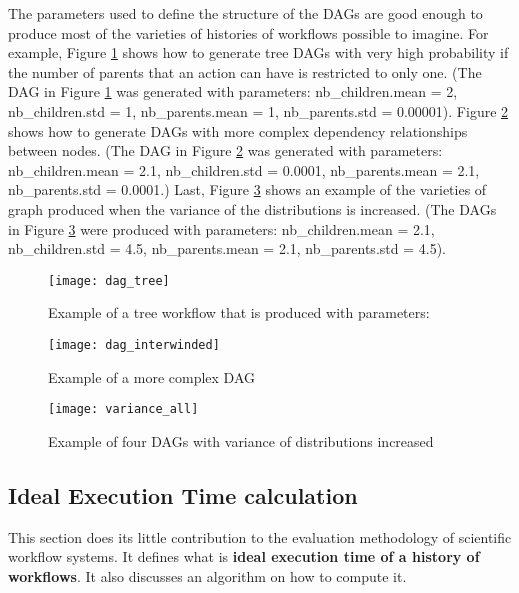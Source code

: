 The parameters used to define the structure of the DAGs are good enough to produce most of the varieties of histories of workflows possible to imagine.  For example, Figure \ref{fig:dag_tree} shows how to generate tree DAGs with very high probability if the number of parents that an action can have is restricted to only one.  (The DAG in Figure \ref{fig:dag_tree} was generated with parameters:
nb\_children.mean = 2, nb\_children.std =  1, nb\_parents.mean = 1, nb\_parents.std = 0.00001). Figure \ref{fig:dag_complex} shows how to generate DAGs with more complex dependency relationships between nodes.  (The DAG in Figure \ref{fig:dag_complex} was generated with parameters:  nb\_children.mean = 2.1, nb\_children.std = 0.0001, nb\_parents.mean = 2.1, nb\_parents.std = 0.0001.) Last, Figure \ref{fig:dag_variety} shows an example of the varieties of graph produced when the variance of the distributions is increased.  (The DAGs in Figure \ref{fig:dag_variety} were produced with parameters: nb\_children.mean = 2.1, nb\_children.std = 4.5, nb\_parents.mean = 2.1, nb\_parents.std = 4.5).
\begin{figure}
\centering
\texttt{[image: dag\_tree]}
\caption{Example of a tree workflow that is produced with parameters: }
\label{fig:dag_tree}
\end{figure}
\begin{figure}
\centering
\texttt{[image: dag\_interwinded]}
\caption{Example of a more complex DAG}
\label{fig:dag_complex}
\end{figure}

\begin{figure}
\centering
\texttt{[image: variance\_all]}
\caption{Example of four DAGs with variance of distributions increased}
\label{fig:dag_variety}
\end{figure}


\subsection{Ideal Execution Time calculation}
This section does its little contribution to the evaluation methodology of scientific workflow systems.  It defines what is \textbf{ideal execution time of a history of workflows}.  It also discusses an algorithm on how to compute it.  

